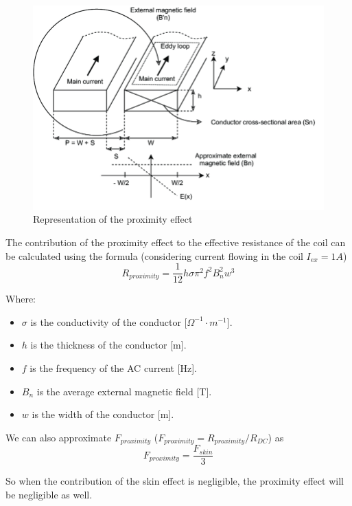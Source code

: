 \begin{itemize}
    \begin{figure}[th]
        \centering
        \includegraphics[scale=0.4]{Chapters/Chapter2/Flexible_PCB_coils/Figures/proximity_effect.png}
        \caption[Proximity effect]{Representation of the proximity effect}
        \label{fig: Proximity effect}
    \end{figure}

    The contribution of the proximity effect to the effective resistance of the coil can be calculated using the formula (considering current flowing in the coil $I_{ex} = 1A$) \cite{AC_res_Optimization}
    \begin{equation}
        R_{proximity} = \frac{1}{12} h \sigma \pi^2 f^2 B_n^2 w^3
    \end{equation}
        
    Where:
    \begin{itemize}
        \item \( \sigma \) is the conductivity of the conductor [\(\Omega^{-1} \cdot m^{-1}\)].
        \item \( h \) is the thickness of the conductor [m].
        \item \( f \) is the frequency of the AC current [Hz].
        \item \( B_n \) is the average external magnetic field [T].
        \item \( w \) is the width of the conductor [m].
    \end{itemize}

    We can also approximate $F_{proximity}$ ($F_{proximity} = R_{proximity}/R_{DC}$) as
    \begin{equation}
        F_{proximity} = \frac{F_{skin}}{3}
    \end{equation}

    So when the contribution of the skin effect is negligible, the proximity effect will be negligible as well.

\end{itemize}





